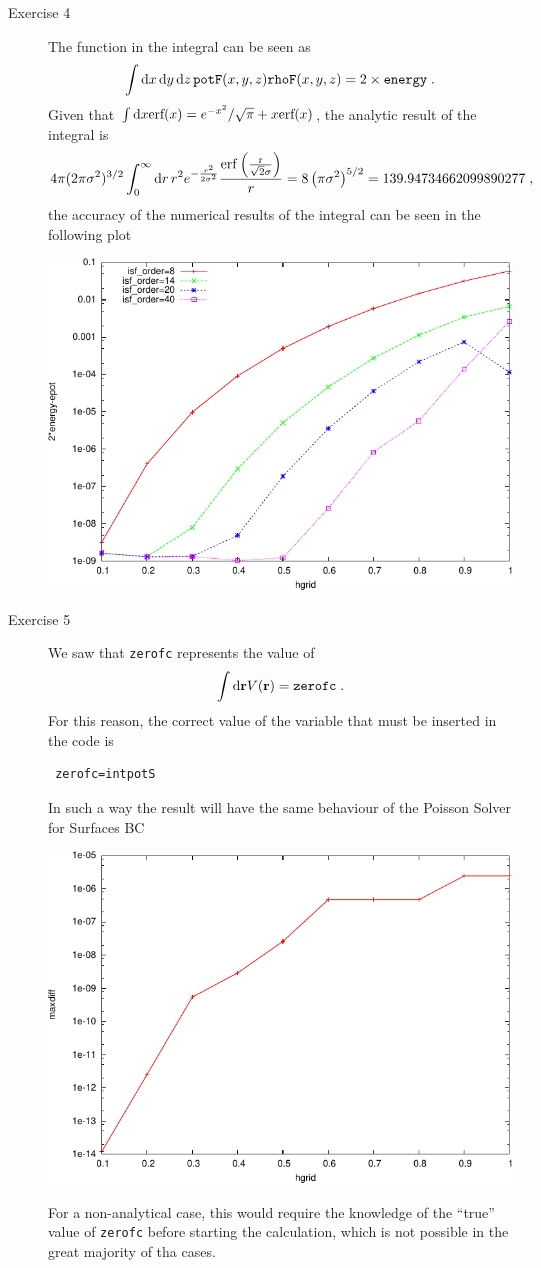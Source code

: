 \documentclass[a4paper]{article}
\newcommand{\dd}{{\rm d}}
\newcommand{\be}{\begin{equation}}
\newcommand{\ee}{\end{equation}}
\begin{document}
\begin{description}
\item[Exercise 4] The function in the integral can be seen as 
\be
\int  \dd x\,\dd y\,\dd z\,  \texttt{potF}(x,y,z) \texttt{rhoF}(x,y,z) = 2 \times \texttt{energy} \;.
\ee
Given that $\int \dd x \text{\rm{erf}}(x) = e^{-x^2} / \sqrt{\pi} + x \text{\rm{erf}}(x)$, the analytic result of the integral is
\be
4 \pi (2 \pi \sigma^2)^{3/2} \int_0^\infty \dd r \, r^2 e^{-\frac{r^2}{2 \sigma^2}}  \frac{\rm{erf}\left(\frac{r}{\sqrt{2} \sigma} \right)}{r} = 8 \left(\pi \sigma^2\right)^{5/2} = 139.94734662099890277\;,
\ee
the accuracy of the numerical results of the integral can be seen in the following plot
\begin{center}
\includegraphics{emepot.pdf}
\end{center}
\newpage
\item[Exercise 5] We saw that \texttt{zerofc} represents the value of
\be
\int \dd \mathbf{r}  V(\mathbf{r}) = \text{\texttt{zerofc}}\;.
\ee
For this reason, the correct value of the variable that must be inserted in the code is
\begin{verbatim}
 zerofc=intpotS
\end{verbatim}
In such a way the result will have the same behaviour of the Poisson Solver for Surfaces BC
\begin{center}
\includegraphics[width=.5\textwidth]{accP.pdf}
\end{center}
For a non-analytical case, this would require the knowledge of the ``true'' value of \texttt{zerofc} before starting the calculation, which is not possible in the great majority of tha cases.


\end{description}
\end{document}
